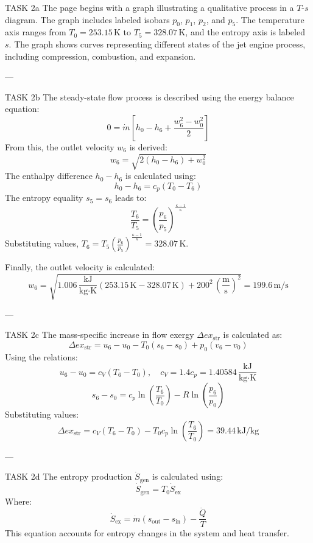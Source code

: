 TASK 2a  
The page begins with a graph illustrating a qualitative process in a \( T \)-\( s \) diagram. The graph includes labeled isobars \( p_0 \), \( p_1 \), \( p_2 \), and \( p_5 \). The temperature axis ranges from \( T_0 = 253.15 \, \text{K} \) to \( T_5 = 328.07 \, \text{K} \), and the entropy axis is labeled \( s \). The graph shows curves representing different states of the jet engine process, including compression, combustion, and expansion.

---

TASK 2b  
The steady-state flow process is described using the energy balance equation:  
\[
0 = \dot{m} \left[ h_0 - h_6 + \frac{w_6^2 - w_0^2}{2} \right]
\]  
From this, the outlet velocity \( w_6 \) is derived:  
\[
w_6 = \sqrt{2 \left( h_0 - h_6 \right) + w_0^2}
\]  
The enthalpy difference \( h_0 - h_6 \) is calculated using:  
\[
h_0 - h_6 = c_p \left( T_0 - T_6 \right)
\]  
The entropy equality \( s_5 = s_6 \) leads to:  
\[
\frac{T_6}{T_5} = \left( \frac{p_6}{p_5} \right)^{\frac{\kappa - 1}{\kappa}}
\]  
Substituting values, \( T_6 = T_5 \left( \frac{p_6}{p_5} \right)^{\frac{\kappa - 1}{\kappa}} = 328.07 \, \text{K} \).

Finally, the outlet velocity is calculated:  
\[
w_6 = \sqrt{1.006 \, \frac{\text{kJ}}{\text{kg·K}} \left( 253.15 \, \text{K} - 328.07 \, \text{K} \right) + 200^2 \, \left( \frac{\text{m}}{\text{s}} \right)^2} = 199.6 \, \text{m/s}
\]

---

TASK 2c  
The mass-specific increase in flow exergy \( \Delta ex_{\text{str}} \) is calculated as:  
\[
\Delta ex_{\text{str}} = u_6 - u_0 - T_0 \left( s_6 - s_0 \right) + p_0 \left( v_6 - v_0 \right)
\]  
Using the relations:  
\[
u_6 - u_0 = c_V \left( T_6 - T_0 \right), \quad c_V = 1.4 c_p = 1.40584 \, \frac{\text{kJ}}{\text{kg·K}}
\]  
\[
s_6 - s_0 = c_p \ln \left( \frac{T_6}{T_0} \right) - R \ln \left( \frac{p_6}{p_0} \right)
\]  
Substituting values:  
\[
\Delta ex_{\text{str}} = c_V \left( T_6 - T_0 \right) - T_0 c_p \ln \left( \frac{T_6}{T_0} \right) = 39.44 \, \text{kJ/kg}
\]

---

TASK 2d  
The entropy production \( \dot{S}_{\text{gen}} \) is calculated using:  
\[
\dot{S}_{\text{gen}} = T_0 \dot{S}_{\text{ex}}
\]  
Where:  
\[
\dot{S}_{\text{ex}} = \dot{m} \left( s_{\text{out}} - s_{\text{in}} \right) - \frac{\dot{Q}}{T}
\]  
This equation accounts for entropy changes in the system and heat transfer.